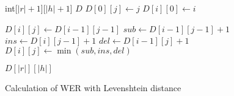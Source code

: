 \documentclass{article}
\begin{document}
\begin{preview}
    \begin{algorithm}[H]
        \begin{algorithmic}
                \State int[$|r|+1$][$|h|+1$] $D$ 
                            \State $D[0][j] \gets j$
                            \State $D[i][0] \gets i$
                        \EndIf
                    \EndFor
                \EndFor

                \State
                 
                            \State $D[i][j] \gets D[i-1][j-1]$
                        \Else
                            \State $sub \gets D[i-1][j-1] + 1$
                            \State $ins \gets D[i][j-1] + 1$
                            \State $del \gets D[i-1][j] + 1$
                            \State $D[i][j] \gets \min(sub, ins, del)$
                        \EndIf
                    \EndFor
                \EndFor

                \State
                \State \Return $D[|r|][|h|]$
            \EndFunction
        \end{algorithmic}
    \caption{Calculation of WER with Levenshtein distance}
    \label{alg:seq1}
    \end{algorithm}
\end{preview}
\end{document}

